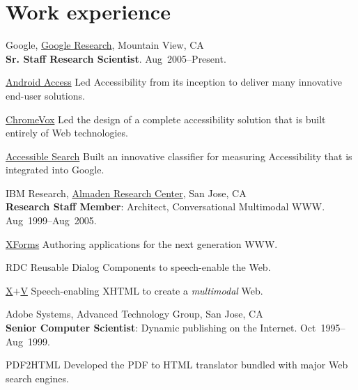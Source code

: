 \documentclass{article}
\begin{document}
\section*{Work experience}
\begin{compactitem}
  \item {Google},
  \href{http://www.google.com/search?q=\%22tv+raman\%22}{Google Research}, Mountain View, CA\\
  \textbf{Sr. Staff Research Scientist}.
\hfill Aug~2005--Present.
\begin{compactdesc}
\item[\href{http://eyes-free.googlecode.com}{Android Access}]  Led  Accessibility from its
inception to deliver many innovative end-user solutions.
\item[\href{http://google-axs-chrome.googlecode.com}{ChromeVox}]  Led the design of a  complete accessibility
solution that is built entirely of Web technologies.
\item[\href{http://labs.google.com/accessible}{Accessible Search}] Built an innovative classifier for
  measuring  Accessibility  that is integrated into Google.
  
\end{compactdesc}

\item {IBM Research},
\href{http://www.google.com/search?q=tv+raman+IBM+Almaden}{Almaden Research Center}, San Jose, CA\\
  \textbf{Research Staff Member}: Architect, Conversational
  Multimodal WWW\@. \hfill Aug~1999--Aug~2005.
\begin{compactdesc}
\item [\href{http://www.amazon.com/XForms-XML-Powered-Web-Forms/dp/0321154991}{XForms}] Authoring applications for the next generation
  WWW.\@
\item [RDC] Reusable Dialog Components to speech-enable the Web.

\item [\href{http://www.w3.org/tr/xml-events}{X$+$V}] Speech-enabling XHTML to create a \emph{multimodal\/}
  Web.
\end{compactdesc}
\item   {Adobe Systems},  {Advanced Technology Group}, San Jose, CA\\
  \textbf{Senior Computer Scientist}: Dynamic publishing on the
  Internet.  \hfill Oct~1995--Aug~1999.
\begin{compactdesc}
\item[PDF2HTML] Developed the PDF to HTML translator bundled with
  major Web search engines.
  

\end{compactdesc}
\end{compactitem}
\end{document}
